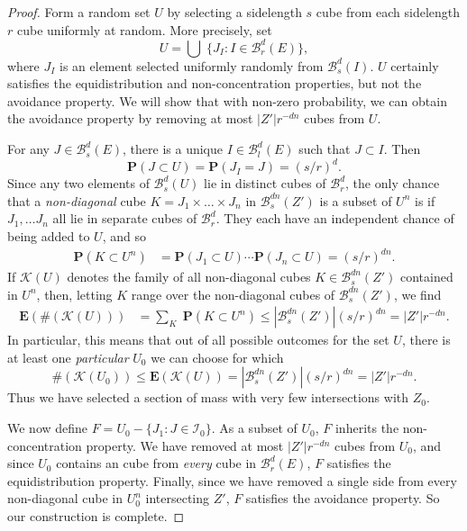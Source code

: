 \documentclass[usenames,dvipsnames]{article}
\theoremstyle{plain}
\theoremstyle{plain}
\begin{document}
\begin{proof}
	Form a random set $U$ by selecting a sidelength $s$ cube from each sidelength $r$ cube uniformly at random. More precisely, set
	\[ U = \bigcup\; \{ J_I: I \in \mathcal{B}^d_r(E) \}, \]
	where $J_I$ is an element selected uniformly randomly from $\mathcal{B}^d_s(I)$. $U$ certainly satisfies the equidistribution and non-concentration properties, but not the avoidance property. We will show that with non-zero probability, we can obtain the avoidance property by removing at most $|Z'|r^{-dn}$ cubes from $U$.

	For any $J \in \mathcal{B}^d_s(E)$, there is a unique $I \in \mathcal{B}^d_l(E)$ such that $J \subset I$. Then
	\[ \mathbf{P}(J \subset U) = \mathbf{P}(J_I = J) = (s/r)^d. \]
	Since any two elements of $\mathcal{B}^d_s(U)$ lie in distinct cubes of $\mathcal{B}^d_r$, the only chance that a {\it non-diagonal} cube $K = J_1 \times \dots \times J_n$ in $\mathcal{B}^{dn}_s(Z')$ is a subset of $U^n$ is if $J_1, \dots J_n$ all lie in separate cubes of $\mathcal{B}^d_r$. They each have an independent chance of being added to $U$, and so
	\begin{align*}
		\mathbf{P}(K \subset U^n) &= \mathbf{P}(J_1 \subset U) \cdots \mathbf{P}(J_n \subset U) = (s/r)^{dn}.
	\end{align*}
	If $\mathcal{K}(U)$ denotes the family of all non-diagonal cubes $K \in \mathcal{B}^{dn}_s(Z')$ contained in $U^n$, then, letting $K$ range over the non-diagonal cubes of $\mathcal{B}^{dn}_s(Z')$, we find
	\begin{align*}
		\mathbf{E}(\# (\mathcal{K}(U))) &= {\sum}_K\; \mathbf{P}(K \subset U^n) \leq |\mathcal{B}^{dn}_s(Z')| (s/r)^{dn} = |Z'| r^{-dn}.
	\end{align*}
	In particular, this means that out of all possible outcomes for the set $U$, there is at least one {\it particular} $U_0$ we can choose for which
	\[ \#(\mathcal{K}(U_0)) \leq \mathbf{E}(\mathcal{K}(U)) = |\mathcal{B}^{dn}_s(Z')| (s/r)^{dn} = |Z'| r^{-dn}. \]
	Thus we have selected a section of mass with very few intersections with $Z_0$.

	We now define $F = U_0 - \{ J_1 : J \in \mathcal{I}_0 \}$. As a subset of $U_0$, $F$ inherits the non-concentration property. We have removed at most $|Z'| r^{-dn}$ cubes from $U_0$, and since $U_0$ contains an cube from {\it every} cube in $\mathcal{B}^d_r(E)$, $F$ satisfies the equidistribution property. Finally, since we have removed a single side from every non-diagonal cube in $U_0^n$ intersecting $Z'$, $F$ satisfies the avoidance property. So our construction is complete.
\end{proof}
\end{document}
